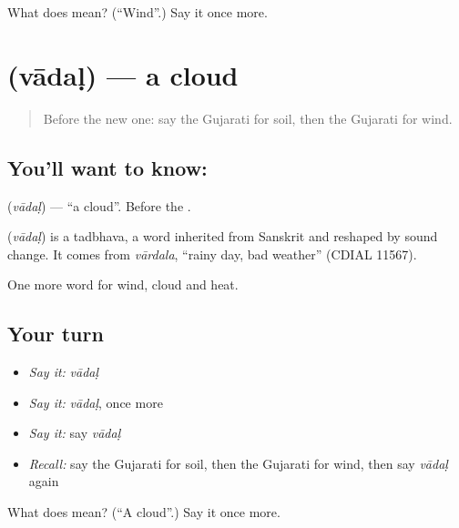\begin{tcolorbox}[breakable,colback=teal!4,colframe=teal!35!black,title={Before you move on}]
What does  mean? (\textquotedblleft{}Wind\textquotedblright{}.) Say it once more.
\end{tcolorbox}
\section[\texorpdfstring{\gu{વાદળ} (vādaḷ)}{વાદળ (vādaḷ)}]{ (vādaḷ) — a cloud}

\label{lesson:GU-C66-cloud}



\begin{quote}
Before the new one: say the Gujarati for soil, then the Gujarati for wind.
\end{quote}

\subsection*{You'll want to know: }
\textbf{} (\emph{vādaḷ}) — \textquotedblleft{}a cloud\textquotedblright{}. Before the \textbf{}.

\begin{cousinweb}
\textbf{} (\emph{vādaḷ}) is a tadbhava, a word inherited from Sanskrit and reshaped by sound change. It comes from \emph{vārdala}, \textquotedblleft{}rainy day, bad weather\textquotedblright{} (CDIAL 11567).
\end{cousinweb}

\begin{grammarlens}[title={What you've built}]
One more word for wind, cloud and heat.
\end{grammarlens}

\subsection*{Your turn}
\begin{itemize}
\raggedright
  \item \emph{Say it:} \emph{vādaḷ}
  \item \emph{Say it:} \emph{vādaḷ}, once more
  \item \emph{Say it:} say \emph{vādaḷ}
  \item \emph{Recall:} say the Gujarati for soil, then the Gujarati for wind, then say \emph{vādaḷ} again
\end{itemize}

\begin{tcolorbox}[breakable,colback=teal!4,colframe=teal!35!black,title={Before you move on}]
What does  mean? (\textquotedblleft{}A cloud\textquotedblright{}.) Say it once more.
\end{tcolorbox}
